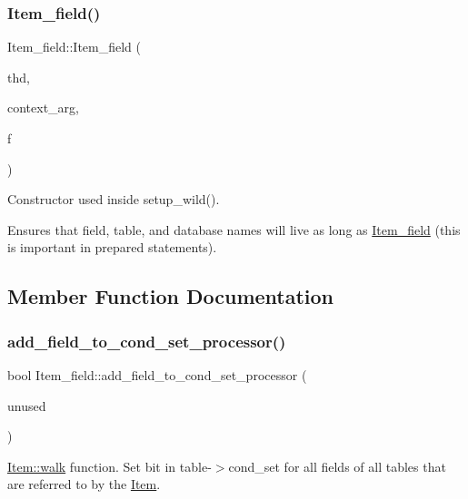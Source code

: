 \subsubsection{\texorpdfstring{Item\+\_\+field()}{Item\_field()}\hspace{0.1cm}{\footnotesize\ttfamily [2/2]}}
{\footnotesize\ttfamily Item\+\_\+field\+::\+Item\+\_\+field (\begin{DoxyParamCaption}\item[{T\+HD $\ast$}]{thd,  }\item[{\mbox{\hyperlink{structName__resolution__context}{Name\+\_\+resolution\+\_\+context}} $\ast$}]{context\+\_\+arg,  }\item[{\mbox{\hyperlink{classField}{Field}} $\ast$}]{f }\end{DoxyParamCaption})}

Constructor used inside setup\+\_\+wild().

Ensures that field, table, and database names will live as long as \mbox{\hyperlink{classItem__field}{Item\+\_\+field}} (this is important in prepared statements). 

\subsection{Member Function Documentation}
\mbox{\label{classItem__field_a9296d0ae378518ab8aed6c1e9c7a3bf9}} 
\subsubsection{\texorpdfstring{add\+\_\+field\+\_\+to\+\_\+cond\+\_\+set\+\_\+processor()}{add\_field\_to\_cond\_set\_processor()}}
{\footnotesize\ttfamily bool Item\+\_\+field\+::add\+\_\+field\+\_\+to\+\_\+cond\+\_\+set\+\_\+processor (\begin{DoxyParamCaption}\item[{uchar $\ast$}]{unused }\end{DoxyParamCaption})\hspace{0.3cm}{\ttfamily [virtual]}}

\mbox{\hyperlink{classItem_ab7d2529511c14a77e59a1b1bbabc95d7}{Item\+::walk}} function. Set bit in table-\/$>$cond\+\_\+set for all fields of all tables that are referred to by the \mbox{\hyperlink{classItem}{Item}}. 

